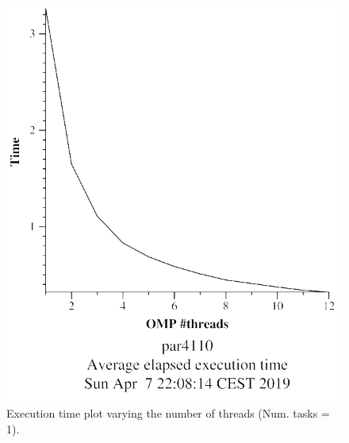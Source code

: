 \documentclass[12pt, a4paper]{article}
\begin{document}
\begin{figure}[H]
\centering
\begin{minipage}[b]{0.4\linewidth}
  \centering
  \includegraphics[scale=0.5]{./mandel-omp-10000-strong-omp-24-1-time}
  \caption{Execution time plot varying the number of threads (Num. tasks = 1).}
  \label{fig:mandel-omp-10000-strong-omp-24-1-time}
\end{minipage}%
\hspace{0.5cm}
\begin{minipage}[b]{0.4\linewidth}
  \centering

\end{minipage}
\end{figure}
\end{document}
